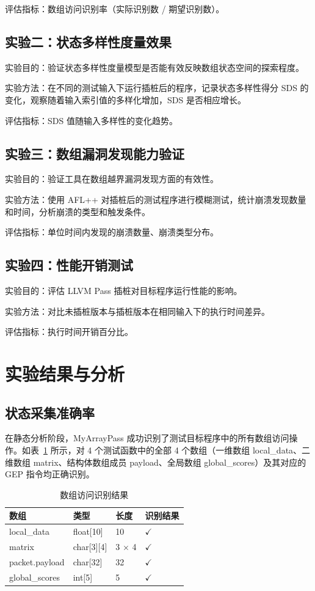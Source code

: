 \documentclass[bachelor]{njupthesis}
\begin{document}
评估指标：数组访问识别率（实际识别数 / 期望识别数）。

\subsection{实验二：状态多样性度量效果}

实验目的：验证状态多样性度量模型是否能有效反映数组状态空间的探索程度。

实验方法：在不同的测试输入下运行插桩后的程序，记录状态多样性得分 SDS 的变化，观察随着输入索引值的多样化增加，SDS 是否相应增长。

评估指标：SDS 值随输入多样性的变化趋势。

\subsection{实验三：数组漏洞发现能力验证}

实验目的：验证工具在数组越界漏洞发现方面的有效性。

实验方法：使用 AFL++ 对插桩后的测试程序进行模糊测试，统计崩溃发现数量和时间，分析崩溃的类型和触发条件。

评估指标：单位时间内发现的崩溃数量、崩溃类型分布。

\subsection{实验四：性能开销测试}

实验目的：评估 LLVM Pass 插桩对目标程序运行性能的影响。

实验方法：对比未插桩版本与插桩版本在相同输入下的执行时间差异。

评估指标：执行时间开销百分比。

\section{实验结果与分析}

\subsection{状态采集准确率}

在静态分析阶段，MyArrayPass 成功识别了测试目标程序中的所有数组访问操作。如表~\ref{tab:recognition} 所示，对 4 个测试函数中的全部 4 个数组（一维数组 local\_data、二维数组 matrix、结构体数组成员 payload、全局数组 global\_scores）及其对应的 GEP 指令均正确识别。

\begin{table}[hbt]
\centering
\caption{数组访问识别结果}
\label{tab:recognition}
\begin{tabular}{|l|l|l|l|}
\hline
\textbf{数组} & \textbf{类型} & \textbf{长度} & \textbf{识别结果} \\
\hline
local\_data & float[10] & 10 & $\checkmark$ \\
matrix & char[3][4] & 3 $\times$ 4 & $\checkmark$ \\
packet.payload & char[32] & 32 & $\checkmark$ \\
global\_scores & int[5] & 5 & $\checkmark$ \\
\hline
\end{tabular}
\end{table}
\end{document}
